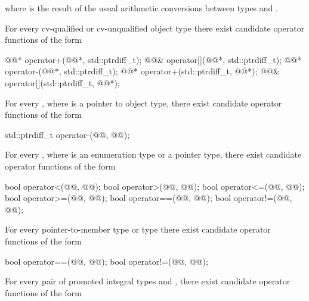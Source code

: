 where
is the result of the usual arithmetic conversions between types
and
.

\pnum
For every cv-qualified or cv-unqualified object type
there exist candidate operator functions of the form

\begin{codeblock}
@@*      operator+(@@*, std::ptrdiff_t);
@@&      operator[](@@*, std::ptrdiff_t);
@@*      operator-(@@*, std::ptrdiff_t);
@@*      operator+(std::ptrdiff_t, @@*);
@@&      operator[](std::ptrdiff_t, @@*);
\end{codeblock}

\pnum
For every
,
where
is a pointer to object type,
there exist candidate operator functions of the form

\begin{codeblock}
std::ptrdiff_t   operator-(@@, @@);
\end{codeblock}

\pnum
For every , where  is an enumeration type or a pointer type,
there exist candidate operator functions of the form

\begin{codeblock}
bool    operator<(@@, @@);
bool    operator>(@@, @@);
bool    operator<=(@@, @@);
bool    operator>=(@@, @@);
bool    operator==(@@, @@);
bool    operator!=(@@, @@);
\end{codeblock}

\pnum
For every pointer-to-member type  or type  there
exist candidate operator functions of the form

\begin{codeblock}
bool    operator==(@@, @@);
bool    operator!=(@@, @@);
\end{codeblock}

\pnum
For every pair of promoted integral types
and
,
there exist candidate operator functions of the form

